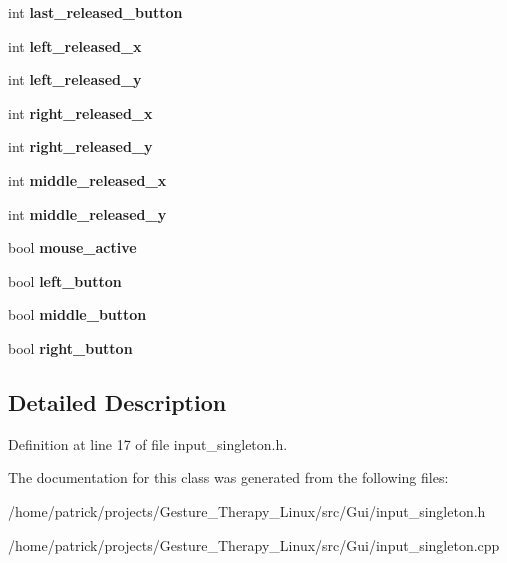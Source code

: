 \begin{DoxyCompactItemize}
int {\bfseries last\+\_\+released\+\_\+button}
\item 
\mbox{\label{class_input_singleton_aa6bf27d8f2c64d06790129346b8d7315}} 
int {\bfseries left\+\_\+released\+\_\+x}
\item 
\mbox{\label{class_input_singleton_a8b537b3e4a8fcaa624cdd8f0fcfb5f9f}} 
int {\bfseries left\+\_\+released\+\_\+y}
\item 
\mbox{\label{class_input_singleton_aa2aae5d88258fdfe478da02de4f9caa2}} 
int {\bfseries right\+\_\+released\+\_\+x}
\item 
\mbox{\label{class_input_singleton_adce35db1fdc6cca1134cf329fc18cc6a}} 
int {\bfseries right\+\_\+released\+\_\+y}
\item 
\mbox{\label{class_input_singleton_a6994134dd6ff26086b91c467cd29ba2c}} 
int {\bfseries middle\+\_\+released\+\_\+x}
\item 
\mbox{\label{class_input_singleton_abc24acc212652b2895710bc29adbffd3}} 
int {\bfseries middle\+\_\+released\+\_\+y}
\item 
\mbox{\label{class_input_singleton_a04cfffc19439756a77564e2208a1bdc0}} 
bool {\bfseries mouse\+\_\+active}
\item 
\mbox{\label{class_input_singleton_ac30bbdf3d597ccae16e0d2f7dd75bf84}} 
bool {\bfseries left\+\_\+button}
\item 
\mbox{\label{class_input_singleton_a1da4a269ee33c505bb1bd3d640c0865a}} 
bool {\bfseries middle\+\_\+button}
\item 
\mbox{\label{class_input_singleton_a0844c0a3d5c3290799010e01c49ebec5}} 
bool {\bfseries right\+\_\+button}
\end{DoxyCompactItemize}


\subsection{Detailed Description}


Definition at line 17 of file input\+\_\+singleton.\+h.



The documentation for this class was generated from the following files\+:\begin{DoxyCompactItemize}
\item 
/home/patrick/projects/\+Gesture\+\_\+\+Therapy\+\_\+\+Linux/src/\+Gui/input\+\_\+singleton.\+h\item 
/home/patrick/projects/\+Gesture\+\_\+\+Therapy\+\_\+\+Linux/src/\+Gui/input\+\_\+singleton.\+cpp\end{DoxyCompactItemize}
